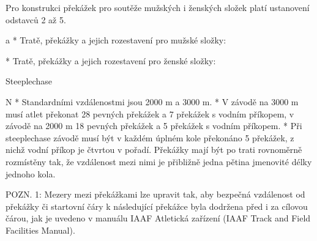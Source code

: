 Pro konstrukci překážek pro soutěže mužských i ženských složek platí ustanovení odstavců 2 až 5.

  \begitems \style a
  * Tratě, překážky a jejich rozestavení pro mužské složky:


  * Tratě, překážky a jejich rozestavení pro ženské složky:

  \enditems
\enditems

\secc Steeplechase

\begitems \style N
* Standardními vzdálenostmi jsou 2000 m a 3000 m.
* V závodě na 3000 m musí atlet překonat 28 pevných překážek a 7 překážek s vodním příkopem, v závodě na 2000 m 18 pevných překážek a 5 překážek s vodním příkopem.
* Při steeplechase závodě musí být v každém úplném kole překonáno 5 překážek, z nichž vodní příkop je čtvrtou v pořadí. Překážky mají být po trati rovnoměrně rozmístěny tak, že vzdálenost mezi nimi je přibližně jedna pětina jmenovité délky jednoho kola.

POZN. 1: Mezery mezi překážkami lze upravit tak, aby bezpečná vzdálenost od překážky či startovní čáry k následující překážce byla dodržena před i za cílovou čárou, jak je uvedeno v manuálu IAAF Atletická zařízení (IAAF Track and Field Facilities Manual).

